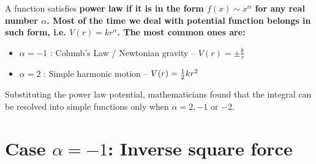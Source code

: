 \documentclass[class=article, crop=false, 12pt]{standalone}
\begin{document}
A function satisfies \bf{power law} if it is in the form $f(x)\sim x^\alpha$ for any real number $\alpha$. 
Most of the time we deal with potential function belongs in such form, 
i.e. $V(r) = kr^\alpha$. The most common ones are:
\begin{itemize}
    \item $\alpha=-1$ : Columb's Law / Newtonian gravity -- $V(r) = \pm \frac{k}{r}$
    \item $\alpha=2$ : Simple harmonic motion -- $V(r) = \frac{1}{2} k r^2$
\end{itemize}

Substituting the power law potential, 
mathematicians found that the integral can be resolved into simple functions only when $\alpha = 2, -1$ or $-2$.  




\linesep
\section{Case $\alpha=-1$: Inverse square force}
\end{document}
